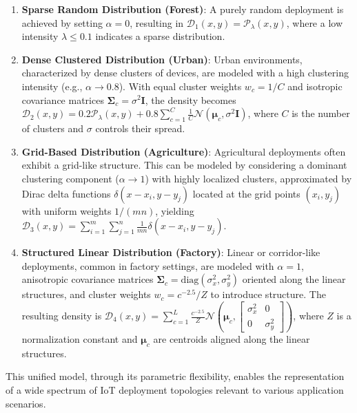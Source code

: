 \documentclass[10pt,conference,letterpaper]{IEEEtran}
\begin{document}
\begin{enumerate}
    \item \textbf{Sparse Random Distribution (Forest)}: A purely random deployment is achieved by setting $\alpha = 0$, resulting in $\mathcal{D}_{1}(x,y) = \mathcal{P}_\lambda(x,y)$, where a low intensity $\lambda \leq 0.1$ indicates a sparse distribution.

    \item \textbf{Dense Clustered Distribution (Urban)}: Urban environments, characterized by dense clusters of devices, are modeled with a high clustering intensity (e.g., $\alpha \rightarrow 0.8$). With equal cluster weights $w_c = 1/C$ and isotropic covariance matrices $\mathbf{\Sigma}_c = \sigma^2\mathbf{I}$, the density becomes $\mathcal{D}_{2}(x,y) = 0.2\mathcal{P}_\lambda(x,y) + 0.8\sum_{c=1}^{C} \frac{1}{C}\mathcal{N}(\mathbf{\mu}_c, \sigma^2\mathbf{I})$, where $C$ is the number of clusters and $\sigma$ controls their spread.

    \item \textbf{Grid-Based Distribution (Agriculture)}: Agricultural deployments often exhibit a grid-like structure. This can be modeled by considering a dominant clustering component ($\alpha \rightarrow 1$) with highly localized clusters, approximated by Dirac delta functions $\delta(x-x_i,y-y_j)$ located at the grid points $(x_i, y_j)$ with uniform weights $1/(mn)$, yielding $\mathcal{D}_{3}(x,y) = \sum_{i=1}^m\sum_{j=1}^n \frac{1}{mn}\delta(x-x_i,y-y_j)$.

    \item \textbf{Structured Linear Distribution (Factory)}: Linear or corridor-like deployments, common in factory settings, are modeled with $\alpha = 1$, anisotropic covariance matrices $\mathbf{\Sigma}_c = \text{diag}(\sigma_x^2, \sigma_y^2)$ oriented along the linear structures, and cluster weights $w_c = c^{-2.5}/Z$ to introduce structure. The resulting density is $\mathcal{D}_{4}(x,y) = \sum_{c=1}^L \frac{c^{-2.5}}{Z}\mathcal{N}\left(\mathbf{\mu}_c, \begin{bmatrix} \sigma_x^2 & 0 \\ 0 & \sigma_y^2 \end{bmatrix}\right)$, where $Z$ is a normalization constant and $\mathbf{\mu}_c$ are centroids aligned along the linear structures.

\end{enumerate}

This unified model, through its parametric flexibility, enables the representation of a wide spectrum of IoT deployment topologies relevant to various application scenarios.
\end{document}

